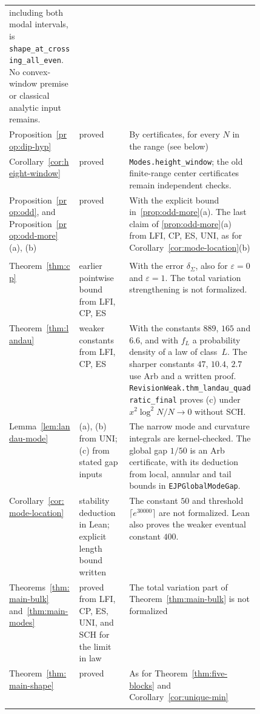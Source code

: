 \begin{table}[htbp]
\begin{tabular}{@{}>{\raggedright\arraybackslash}p{0.28\linewidth}>{\raggedright\arraybackslash}p{0.2\linewidth}>{\raggedright\arraybackslash}p{}@{}}
including both modal intervals, is \texttt{shape\_at\_crossing\_all\_even}. No
convex-window premise or classical analytic input remains.\\
Proposition~\ref{prop:dip-hyp} &
proved & By certificates, for every $N$ in the range (see below)\\
Corollary~\ref{cor:height-window} & proved & \texttt{Modes.height\_window};
the old finite-range center certificates remain independent checks.\\
Proposition~\ref{prop:odd}, and Proposition~\ref{prop:odd-more}(a), (b) & proved & With the explicit bound
in~\ref{prop:odd-more}(a). The last claim of \ref{prop:odd-more}(a) from LFI, CP, ES, UNI, as for
Corollary~\ref{cor:mode-location}(b)\\
\midrule
\multicolumn{3}{@{}l}{\emph{Section~\ref{sec:shape}, bulk and mode}}\\
Theorem~\ref{thm:cp} & earlier pointwise bound from LFI, CP, ES & With the error
$\delta_\Sigma$, also for $\varepsilon=0$ and $\varepsilon=1$.
The total variation strengthening is not formalized.\\
Theorem~\ref{thm:landau} & weaker constants from LFI, CP, ES & With
the constants $889$, $165$ and $6.6$, and with $f_L$ a probability density of a law of
class~$L$. The sharper constants $47$, $10.4$, $2.7$ use Arb and a written proof.
\texttt{RevisionWeak.thm\_landau\_quadratic\_final} proves (c) under
$x^2\log^2 N/N\to0$ without SCH.\\
Lemma~\ref{lem:landau-mode} & (a), (b) from UNI; (c) from stated gap inputs &
The narrow mode and curvature integrals are kernel-checked.
The global gap $1/50$ is an Arb certificate, with its deduction from local,
annular and tail bounds in \texttt{EJPGlobalModeGap}.\\
Corollary~\ref{cor:mode-location} & stability deduction in Lean; explicit length bound written &
The constant $50$ and threshold $\lceil e^{30000}\rceil$ are not formalized.
Lean also proves the weaker eventual constant $400$.\\
Theorems~\ref{thm:main-bulk} and~\ref{thm:main-modes} & proved from LFI, CP,
ES, UNI, and SCH for the limit in law & The total variation part of
Theorem~\ref{thm:main-bulk} is not formalized\\
Theorem~\ref{thm:main-shape} & proved & As for
Theorem~\ref{thm:five-blocks} and Corollary~\ref{cor:unique-min}\\
\midrule
\multicolumn{3}{@{}l}{\emph{Section~\ref{sec:bulk-applications}}}\\

\end{tabular}
\end{table}
